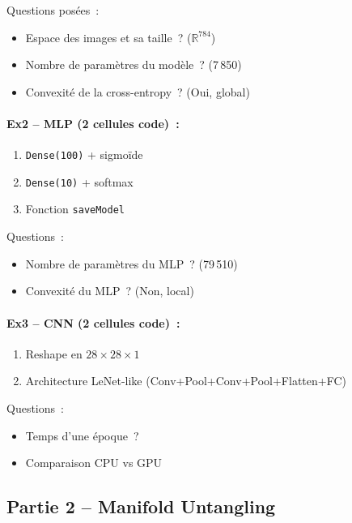 \documentclass[a4paper,11pt]{article}
\begin{document}
Questions pos\'ees~:
\begin{itemize}
  \item Espace des images et sa taille~? ($\mathbb{R}^{784}$)
  \item Nombre de param\`etres du mod\`ele~? (7\,850)
  \item Convexit\'e de la cross-entropy~? (Oui, global)
\end{itemize}

\paragraph{Ex2 -- MLP (2 cellules code)~:}
\begin{enumerate}
  \item \texttt{Dense(100)} + sigmo\"ide
  \item \texttt{Dense(10)} + softmax
  \item Fonction \texttt{saveModel}
\end{enumerate}

Questions~:
\begin{itemize}
  \item Nombre de param\`etres du MLP~? (79\,510)
  \item Convexit\'e du MLP~? (Non, local)
\end{itemize}

\paragraph{Ex3 -- CNN (2 cellules code)~:}
\begin{enumerate}
  \item Reshape en $28\times28\times1$
  \item Architecture LeNet-like (Conv+Pool+Conv+Pool+Flatten+FC)
\end{enumerate}

Questions~:
\begin{itemize}
  \item Temps d'une \'epoque~?
  \item Comparaison CPU vs GPU
\end{itemize}

\subsection{Partie 2 -- Manifold Untangling}
\end{document}
